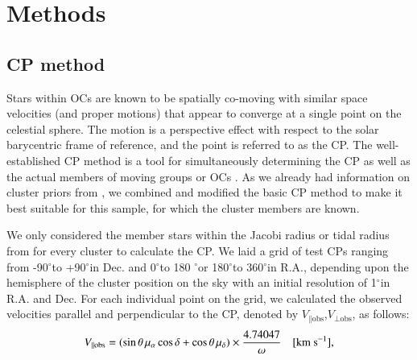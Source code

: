 \documentclass{aa}
\newcommand\arcdeg{\mbox{$^\circ$}}%
\begin{document}
\section{Methods} \label{sec:methods}

\subsection{CP method}\label{sec: CP}

Stars within OCs are known to be spatially co-moving with similar space velocities (and proper motions) that appear to converge at a single point on the celestial sphere. The motion is a perspective effect with respect to the solar barycentric frame of reference, and the point is referred to as the CP. The well-established CP method is a tool for simultaneously determining the CP as well as the actual members of moving groups or OCs \citep{1971MNRAS.152..231J,1999MNRAS.306..381D,2009A&A...497..209V}. As we already had information on cluster priors from , we combined and modified the basic CP method \citep{1971MNRAS.152..231J,1999MNRAS.306..381D} to make it best suitable for this sample, for which the cluster members are known. 

We only considered the member stars within the Jacobi radius or tidal radius from  for every cluster to calculate the CP. We laid a grid of test CPs ranging from -90\arcdeg to +90\arcdeg in Dec. and 0\arcdeg to 180 \arcdeg or 180\arcdeg  to 360\arcdeg in R.A., depending upon the hemisphere of the cluster position on the sky with an initial resolution of 1\arcdeg in R.A. and Dec. For each individual point on the grid, we calculated the observed velocities parallel and perpendicular to the CP, denoted by $V_{\parallel \text{obs}}$,$V_{\perp \text{obs}}$, as follows: 
\begin{equation} \label{eq:v_parallal_obs}
V_{\parallel \text{obs}} = (\sin\theta \, \mu_{\alpha}\cos\delta + \cos\theta \, \mu_{\delta}) \times \frac{4.74047}{\omega} \quad [\rm{km \ s^{-1}}],
\end{equation}
\end{document}
